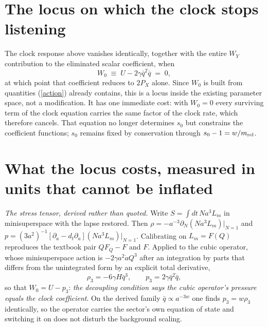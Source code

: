 \documentclass[11pt,letterpaper]{article}
\begin{document}
\section{The locus on which the clock stops listening}
The clock response above vanishes identically, together with the entire $W_Y$ contribution to the eliminated scalar coefficient, when
\begin{equation}
W_0\;\equiv\;U-2\gamma\bar q^2\dot{\bar q}\;=\;0 ,
\label{locus}
\end{equation}
at which point that coefficient reduces to $2P_X$ alone. Since $W_0$ is built from quantities (\ref{action}) already contains, this is a locus inside the existing parameter space, not a modification. It has one immediate cost: with $W_0=0$ every surviving term of the clock equation carries the same factor of the clock rate, which therefore cancels. That equation no longer determines $s_0$ but constrains the coefficient functions; $s_0$ remains fixed by conservation through $s_0-1=w/m_{\rm rel}$.

\section{What the locus costs, measured in units that cannot be inflated}
\emph{The stress tensor, derived rather than quoted.} Write $S=\int dt\,Na^3L_m$ in minisuperspace with the lapse restored. Then $\rho=-a^{-3}\partial_N(Na^3L_m)|_{N=1}$ and $p=(3a^2)^{-1}[\partial_a-d_t\partial_{\dot a}](Na^3L_m)|_{N=1}$. Calibrating on $L_m=F(Q)$ reproduces the textbook pair $QF_Q-F$ and $F$. Applied to the cubic operator, whose minisuperspace action is $-2\gamma a^2\dot a Q^3$ after an integration by parts that differs from the unintegrated form by an explicit total derivative,
\begin{equation}
\rho_3=-6\gamma H\bar q^3,\qquad p_3=2\gamma\bar q^2\dot{\bar q},
\end{equation}
so that $W_0=U-p_3$: \emph{the decoupling condition says the cubic operator's pressure equals the clock coefficient}. On the derived family $\bar q\propto a^{-3w}$ one finds $p_3=w\rho_3$ identically, so the operator carries the sector's own equation of state and switching it on does not disturb the background scaling.
\end{document}
